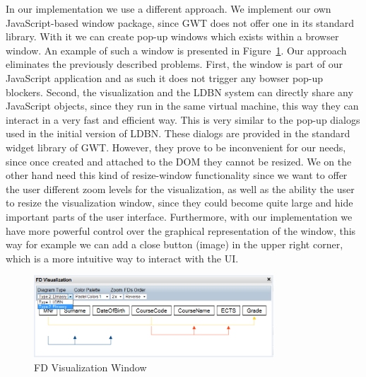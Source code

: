 In our implementation we use a different approach. We implement our own 
JavaScript-based window package, since GWT does not offer one in its standard library.
With it we can create pop-up windows which exists within a browser window. 
An example of such a window is presented in Figure~\ref{fig:fd-visual-win}. 
Our approach eliminates the previously described problems. First,
the window is part of our JavaScript application and as such it does not 
trigger any bowser pop-up blockers. 
Second, the visualization and the LDBN system can directly share any 
JavaScript objects, since they run in the same virtual machine, 
this way they can interact in a very fast and efficient way. 
This is very similar to the pop-up dialogs used in the initial version of LDBN. 
These dialogs are provided in the standard widget library of GWT. 
However, they prove to be inconvenient for our needs, since once created and attached 
to the DOM they cannot be resized. We on the other hand
need this kind of resize-window functionality since we want to offer the user
different zoom levels for the visualization, as well as the ability the user to resize the
visualization window, since they could become quite large and hide important parts of the user 
interface. Furthermore, with our implementation we have more powerful control over
the graphical representation of the window, this way for example we can add a close button (image)
in the upper right corner, which is a more intuitive way to interact with the UI.

\begin{figure}[h]
	\begin{center}
		\includegraphics[width=0.8\textwidth]{./img/fd-visual-win.png}
		\caption{FD Visualization Window}
		\label{fig:fd-visual-win}
	\end{center}
\end{figure}


